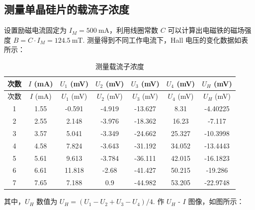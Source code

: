 \documentclass{customDoc}
\begin{document}
\subsection{测量单晶硅片的载流子浓度}

设置励磁电流固定为 $I_M = \SI{500}{\milli\ampere}$，利用线圈常数 $C$ 可以计算出电磁铁的磁场强度 $B = C\cdot I_M = \SI{124.5}{\milli\tesla}$. 测量得到不同工作电流下，Hall 电压的变化数据如表所示：

\begin{longtable}{|c|c|c|c|c|c|c|}
    \caption{测量载流子浓度} \\
    \hline
    次数 & $I$ (\si{\milli\ampere}) & $U_1$ (\si{\milli\volt}) & $U_2$ (\si{\milli\volt}) & $U_3$ (\si{\milli\volt}) & $U_4$ (\si{\milli\volt}) & $U_H$ (\si{\milli\volt}) \\
    \hline
    \endfirsthead
    \hline
    次数 & $I$ (\si{\milli\ampere}) & $U_1$ (\si{\milli\volt}) & $U_2$ (\si{\milli\volt}) & $U_3$ (\si{\milli\volt}) & $U_4$ (\si{\milli\volt}) & $U_H$ (\si{\milli\volt}) \\
    \hline
    \endhead
    1     & 1.55  & -0.591 & -4.919 & -13.627 & 8.31  & -4.40225 \\
    \hline
    2     & 2.55  & 2.148 & -3.976 & -18.362 & 16.23 & -7.117 \\
    \hline
    3     & 3.57  & 5.041 & -3.349 & -24.662 & 25.327 & -10.3998 \\
    \hline
    4     & 4.58  & 7.824 & -3.643 & -31.192 & 34.052 & -13.4443 \\
    \hline
    5     & 5.61  & 9.613 & -3.784 & -36.111 & 42.015 & -16.1823 \\
    \hline
    6     & 6.61  & 11.818 & -2.68 & -41.427 & 50.215 & -19.286 \\
    \hline
    7     & 7.65  & 7.188 & 0.9   & -44.982 & 53.205 & -22.9748 \\
    \hline
\end{longtable}

其中，$U_H$ 数值为 $U_H = (U_1 - U_2 + U_3 - U_4)/4$. 作 $U_H$ - $I$ 图像，如图所示：
\end{document}
